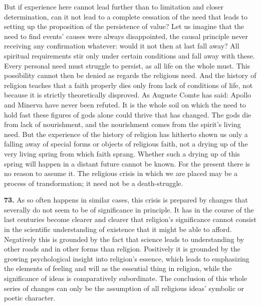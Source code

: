 \documentclass[12pt,a4paper]{book}
\newcommand{\opage}[1]{\marginnote{\footnotesize\textit{[#1]}}}
\begin{document}
But if experience here cannot lead further than to limitation and closer determination, can it not
lead to a complete cessation of the need that leads to setting up the proposition of the persistence
of value? Let us imagine that the need to find events' causes were always disappointed, the causal
principle never receiving any confirmation whatever: would it not then at last fall away? All
spiritual requirements stir only under certain conditions and fall away with these. Every personal
need must struggle to persist, as all life on the whole must. This possibility cannot then be denied
as regards the religious need. And the history of religion teaches that a faith properly dies only
from lack of conditions of life, not because it is strictly theoretically disproved. As Auguste Comte
has said: Apollo and Minerva have never been refuted. It is the whole soil on which the need to hold
fast these figures of gods alone could thrive that has changed. The gods die from lack of
nourishment, and the nourishment comes from the spirit's living need. But the experience of the
history of religion has hitherto shown us only a falling away of special forms or objects of
religious faith, not a drying up of the very living spring from which faith sprang.
\opage{170}Whether such a drying up of this spring will happen in a distant future cannot be known. For the
present there is no reason to assume it. The religious crisis in which we are placed may be a process
of transformation; it need not be a death-struggle.

\medskip

\noindent\textbf{73.} As so often happens in similar cases, this crisis is prepared by changes that
severally do not seem to be of significance in principle. It has in the course of the last centuries
become clearer and clearer that religion's significance cannot consist in the scientific
understanding of existence that it might be able to afford. Negatively this is grounded by the fact
that science leads to understanding by other roads and in other forms than religion. Positively it is
grounded by the growing psychological insight into religion's essence, which leads to emphasizing the
elements of feeling and will as the essential thing in religion, while the significance of ideas is
comparatively subordinate. The conclusion of this whole series of changes can only be the assumption
of all religious ideas' symbolic or poetic character.
\end{document}
